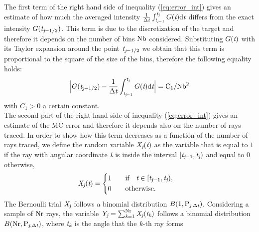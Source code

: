 \indent The first term of the right hand side of inequality (\ref{eq:error_int}) gives an estimate of how much the averaged intensity
 $\frac{1}{\Delta \textit{t}}\int_{\textit{t}_{\textit{j}-1}}^{\textit{t}_{\textit{j}}} G(\textit{t})\textrm{d}\textit{t}$ differs from the exact intensity $G(\textit{t}_{\textit{j}-1/2})$.
This term is due to the discretization of the target and therefore it depends on the number of bins $\textrm{Nb}$ considered.
  Substituting $G(\textit{t})$ with its Taylor expansion around the point $\textit{t}_{\textit{j}-1/2}$ we obtain that this term is proportional to the square of the size of the bins, therefore the following equality holds:
\begin{equation}\Big|G(\textit{t}_{\textit{j}-1/2})-\frac{1}{\Delta \textit{t}}\int_{\textit{t}_{\textit{j}-1}}^{\textit{t}_{\textit{j}}} G(\textit{t})\textrm{d}\textit{t}\Big| = \textrm{C}_1/\textrm{Nb}^2\end{equation}
with $C_1>0$ a certain constant. \\
\indent
The second part of the right hand side of inequality (\ref{eq:error_int}) gives an estimate of the MC error and therefore it depends also on the
number of rays traced.
In order to show how this term decreases as a function of the number of rays traced,
we define the random variable $\textit{X}_{\textit{j}}(\textit{t})$ as the variable that is equal to $1$ if the ray with angular coordinate $\textit{t}$
is inside the interval $[\textit{t}_{\textit{j}-1}, \textit{t}_{\textit{j}})$ and equal to $0$ otherwise,
\begin{equation}
\label{radom_variable}
\textit{X}_{\textit{j}}(\textit{t}) = \begin{cases} \begin{aligned}
1& \qquad \mbox{if} \quad \textit{t}\in [\textit{t}_{\textit{j}-1}, \textit{t}_{\textit{j}}),\\
0 & \qquad \mbox{otherwise}.
\end{aligned}\end{cases}
\end{equation}
The Bernoulli trial $ \textit{X}_{\textit{j}}$ follows a binomial distribution $B(1,\textrm{P}_{\textit{j}, \Delta\textit{t}})$.
Considering a sample of $\textrm{Nr}$ rays, the variable $\textit{Y}_{\textit{j}} = \sum_{\textit{k}=1}^{\textrm{Nr}} \textit{X}_{\textit{j}}(\textit{t}_{\textit{k}})$
follows a binomial distribution $B(\textrm{Nr}, \textrm{P}_{\textit{j},\Delta \textit{t}})$, where $\textit{t}_{\textit{k}}$ is the angle that the $\textit{k}$-th ray forms
